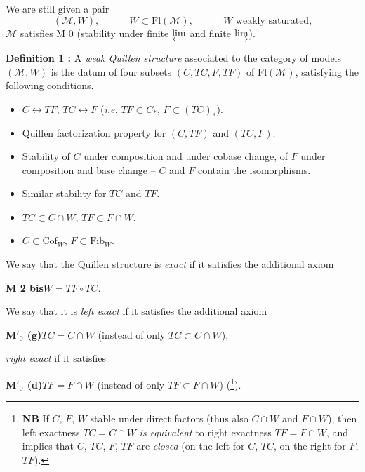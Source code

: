 \documentclass[11pt]{article}
\newcommand{\printedpage}[1]{\marginpar{\footnotesize p.~#1}}
\newcommand{\Cof}{\mathrm{Cof}}
\newcommand{\Fib}{\mathrm{Fib}}
\begin{document}
We are still given a pair
\[
(\mathcal{M}, W), \qquad\quad W \subset \mathrm{Fl}(\mathcal{M}), \qquad\quad W \text{ weakly saturated,}
\]
$\mathcal{M}$ satisfies M 0 (stability under finite $\varprojlim$ and finite $\varinjlim$).

\noindent\textbf{Definition 1 :} A \textit{weak Quillen structure} associated to the category of models $(\mathcal{M}, W)$ is the datum of four subsets $(C, TC, F, TF)$ of $\mathrm{Fl}(\mathcal{M})$, satisfying the following conditions.

\begin{itemize}[leftmargin=3em,labelsep=0.5em,align=left]
\item[\textbf{M 1}] $C \longleftrightarrow TF$, $TC \longleftrightarrow F$ (\textit{i.e.} $TF \subset C_*$, $F \subset (TC)_*$).
\item[\textbf{M 2}] Quillen factorization property for $(C, TF)$ and $(TC, F)$.
\item[\textbf{M 3}] Stability of $C$ under composition and under cobase change, of $F$ under composition and base change -- $C$ and $F$ contain the isomorphisms.
\item[\textbf{M 4}] Similar stability for $TC$ and $TF$.
\item[$\mathbf{M}'$] $TC \subset C \cap W$, $TF \subset F \cap W$.
\item[$\mathbf{M}''$] $C \subset \Cof_W$, $F \subset \Fib_W$.
\end{itemize}

\noindent We say that the Quillen structure is \textit{exact} if it satisfies the additional axiom

\clearpage
\printedpage{17}

\noindent\textbf{M 2 bis}\qquad $W = TF \circ TC$.

\noindent We say that it is \textit{left exact} if it satisfies the additional axiom

\noindent\textbf{M$'_0$ (g)}\qquad $TC = C \cap W$ (instead of only $TC \subset C \cap W$),

\noindent\textit{right exact} if it satisfies

\noindent\textbf{M$'_0$ (d)}\qquad $TF = F \cap W$ (instead of only $TF \subset F \cap W$) (\footnote[20]{\textbf{NB} If $C$, $F$, $W$ stable under direct factors (thus also $C \cap W$ and $F \cap W$), then left exactness $TC = C \cap W$ \textit{is equivalent} to right exactness $TF = F \cap W$, and implies that $C$, $TC$, $F$, $TF$ are \textit{closed} (on the left for $C$, $TC$, on the right for $F$, $TF$).}).
\end{document}
